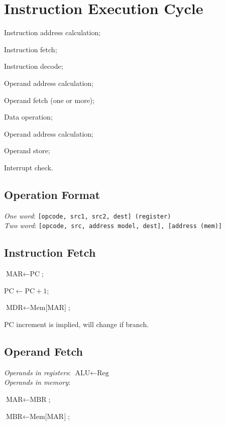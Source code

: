 \section{Instruction Execution Cycle}

\begin{enumerate*}[label=(\arabic*)]
    \item Instruction address calculation;
    \item Instruction fetch;
    \item Instruction decode;
    \item Operand address calculation;
    \item Operand fetch (one or more);
    \item Data operation;
    \item Operand address calculation;
    \item Operand store;
    \item Interrupt check.
\end{enumerate*}

\subsection*{Operation Format}
\emph{One word}: \texttt{[opcode, src1, src2, dest] (register)}\\
\emph{Two word}: \texttt{[opcode, src, address model, dest], [address (mem)]}

\subsection*{Instruction Fetch}
\begin{enumerate*}[label=(\arabic*)]
    \item $\text{MAR} \leftarrow \text{PC}$;
    \item $\text{PC} \leftarrow \text{PC} + 1$;
    \item $\text{MDR} \leftarrow \text{Mem[MAR]}$;
\end{enumerate*}
PC increment is implied, will change if branch.

\subsection*{Operand Fetch}
\emph{Operands in registers}: $\text{ALU} \leftarrow \text{Reg}$\\
\emph{Operands in memory}: \begin{enumerate*}[label=(\arabic*)]
    \item $\text{MAR} \leftarrow \text{MBR}$;
    \item $\text{MBR} \leftarrow \text{Mem[MAR]}$;
\end{enumerate*}

